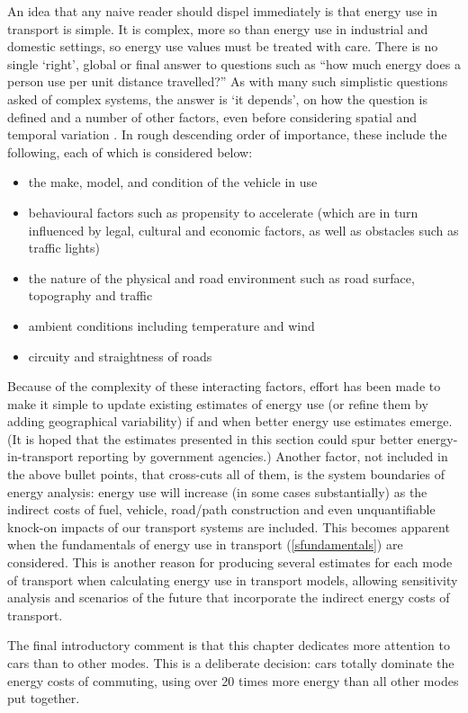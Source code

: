 \documentclass[a4paper, 11pt, twoside]{Thesis}
\begin{document}
An idea that any naive reader should dispel immediately is that energy use in
transport is simple. It is complex, more so than energy use in industrial and
domestic settings, so energy use values must be treated with care.
There is no single `right', global or final answer to questions such as
``how much energy does a
person use per unit distance travelled?'' As with many such simplistic questions
asked of complex systems, the answer is `it depends', on how the question
is defined and a number of other factors, even before
considering spatial and temporal variation
\citep{Agency2005, Fels1973, Lenzen1999}. In rough descending order of importance, these
include the following, each of which is considered below:
\begin{itemize}
 \item the make, model, and condition of the vehicle in use
 \item behavioural factors such as propensity to accelerate (which are in
 turn influenced by legal, cultural and economic factors, as well as obstacles such as traffic lights)
 \item the nature of the physical and road environment such as road surface, topography and traffic
 \item ambient conditions including temperature and wind
 \item circuity and straightness of roads
\end{itemize}
Because of the complexity of these interacting factors,
effort has been made to make it simple to update existing estimates of energy
use (or refine them by adding geographical variability) if and when better
energy use estimates emerge. (It is hoped that the estimates presented in this
section could spur better energy-in-transport reporting by government agencies.)
Another factor, not included in the above bullet points, that cross-cuts all
of them, is the system boundaries of energy analysis: energy use will increase
(in some cases substantially) as the indirect costs of fuel,
vehicle, road/path construction and even unquantifiable knock-on impacts of
our transport systems are included. This becomes apparent when
the fundamentals of energy use in transport (\cref{sfundamentals}) are
considered. This is another reason for producing several estimates
for each mode of transport when calculating energy
use in transport models, allowing sensitivity
analysis and scenarios of the future that incorporate the indirect energy costs
of transport.

The final introductory comment is that this chapter dedicates more attention to
cars than to other modes. This is a deliberate decision: cars totally dominate
the energy costs of commuting, using over 20 times more energy than all other modes
put together. 
\end{document}
